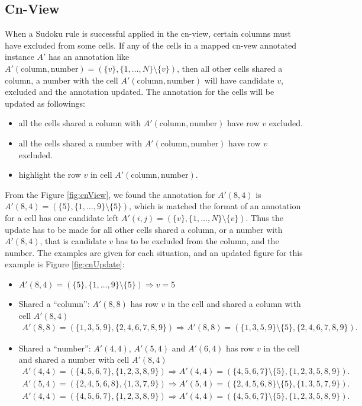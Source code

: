 \documentclass[11pt]{report}
\newcommand{\set}[1]{\{ #1 \}}
\begin{document}
\subsection{Cn-View}
\label{sec:basicrulecn}

When a Sudoku rule is successful applied in the cn-view, certain columns must have excluded from some cells. If any of the cells in a mapped cn-vew annotated instance $A'$ has an annotation like $A'(\text{column}, \text{number}) =(\set{v}, \set{1,\dots,N} \setminus \set{v})$, then all other cells shared a column, a number with the cell $A'(\text{column}, \text{number})$ will have candidate $v$, excluded and the annotation updated. The annotation for the cells will be updated as followings:
\begin{itemize}
\item all the cells shared a column with $A'(\text{column}, \text{number})$ have row $v$ excluded.
\item all the cells shared a number with $A'(\text{column}, \text{number})$ have row $v$ excluded.
\item highlight the row $v$ in cell $A'(\text{column}, \text{number})$.
\end{itemize} 

From the Figure \ref{fig:cnView}, we found the annotation for $A'(8,4)$ is $A'(8, 4) =(\set{5}, \set{1, \dots, 9} \setminus \set{5})$, which is matched the format of an annotation for a cell has one candidate left $A'(i,j) =(\set{v}, \set{1,\dots,N} \setminus \set{v})$. Thus the update has to be made for all other cells shared a column, or a number with $A'(8,4)$, that is candidate $v$ has to be excluded from the column, and the number. The examples are given for each situation, and an updated figure for this example is Figure \ref{fig:cnUpdate}:
\begin{itemize}
\item $A'(8,4) =(\set{5}, \set{1, \dots, 9} \setminus \set{5}) \Rightarrow v = 5$
\item Shared a ``column'': $A'(8,8)$ has row $v$ in the cell and shared a column with cell $A'(8,4)$
\begin{eqnarray*}
A'(8,8) =(\set{1, 3, 5, 9}, \set{2, 4, 6, 7, 8, 9})\Rightarrow A'(8,8) =(\set{1, 3, 5, 9}\setminus \set{5}, \set{2, 4, 6, 7, 8, 9}).
\end{eqnarray*}
\item Shared a ``number'': $A'(4,4)$, $A'(5,4)$ and $A'(6,4)$ has row $v$ in the cell and shared a number with cell $A'(8,4)$
\begin{eqnarray*}
A'(4,4) =(\set{4, 5, 6, 7}, \set{1, 2, 3, 8, 9})\Rightarrow A'(4,4) =(\set{4, 5, 6, 7}\setminus \set{5}, \set{1, 2, 3, 5, 8, 9}).\\
A'(5,4) =(\set{2, 4, 5, 6, 8}, \set{1, 3, 7, 9})\Rightarrow A'(5,4) =(\set{2, 4, 5, 6, 8}\setminus \set{5}, \set{1, 3, 5, 7, 9}).\\
A'(4,4) =(\set{4, 5, 6, 7}, \set{1, 2, 3, 8, 9})\Rightarrow A'(4,4) =(\set{4, 5, 6, 7}\setminus \set{5}, \set{1, 2, 3, 5, 8, 9}).
\end{eqnarray*}
\end{itemize}
\end{document}

